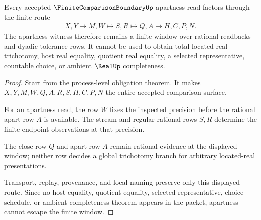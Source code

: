 \begin{theorem}
\label{thm:finite-comparison-boundary-apartness-nonescape}
Every accepted $\FiniteComparisonBoundaryUp$ apartness read factors through the finite route
$$
\begin{gathered}
X,Y \longmapsto M,W \longmapsto S,R \longmapsto Q,A \longmapsto H,C,P,N .
\end{gathered}
$$
The apartness witness therefore remains a finite window over rational readbacks and dyadic tolerance rows. It cannot be used to obtain total located-real trichotomy, host real equality, quotient real equality, a selected representative, countable choice, or ambient $\RealUp$ completeness.
\end{theorem}
\begin{proof}
Start from the process-level obligation theorem. It makes $X,Y,M,W,Q,A,R,S,H,C,P,N$ the entire accepted comparison surface.

For an apartness read, the row $W$ fixes the inspected precision before the rational apart row $A$ is available. The stream and regular rational rows $S,R$ determine the finite endpoint observations at that precision.

The close row $Q$ and apart row $A$ remain rational evidence at the displayed window; neither row decides a global trichotomy branch for arbitrary located-real presentations.

Transport, replay, provenance, and local naming preserve only this displayed route. Since no host equality, quotient equality, selected representative, choice schedule, or ambient completeness theorem appears in the packet, apartness cannot escape the finite window.
\end{proof}


\begin{closurestatus}{\FiniteComparisonBoundaryUp}
  \theoryclosure{\seedClosure}
  \formalstatus{\unformalizedV}
\end{closurestatus}
